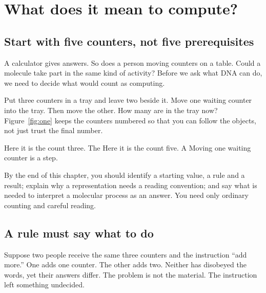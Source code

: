 \chapter{What does it mean to compute?}\label{ch:one}
\section{Start with five counters, not five prerequisites}\label{sec:count}
A calculator gives answers. So does a person moving counters on a table. Could a molecule take part in the same kind of activity? Before we ask what DNA can do, we need to decide what would count as computing.

Put three counters in a tray and leave two beside it. Move one waiting counter into the tray. Then move the other. How many are in the tray now? Figure~\ref{fig:one} keeps the counters numbered so that you can follow the objects, not just trust the final number.

 Here it is the count three. The  Here it is the count five. A  Moving one waiting counter is a step.

By the end of this chapter, you should identify a starting value, a rule and a result; explain why a representation needs a reading convention; and say what is needed to interpret a molecular process as an answer. You need only ordinary counting and careful reading.

\clearpage
\section{A rule must say what to do}\label{sec:rule}
Suppose two people receive the same three counters and the instruction “add more.” One adds one counter. The other adds two. Neither has disobeyed the words, yet their answers differ. The problem is not the material. The instruction left something undecided.

